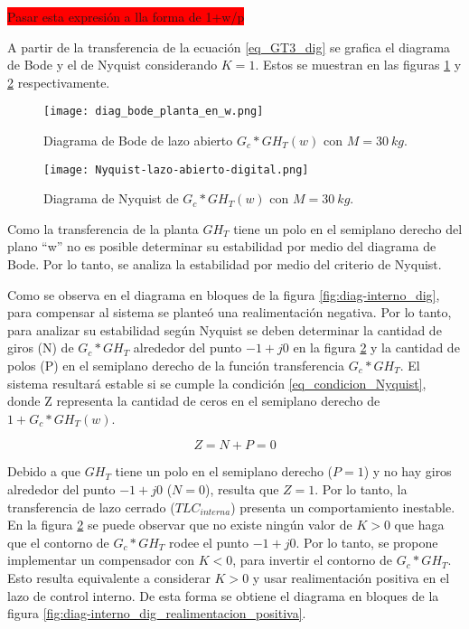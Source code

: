 \colorbox{red}{Pasar esta expresión a lla forma de 1+w/p}

 A partir de la transferencia de la ecuación  \ref{eq_GT3_dig} se  grafica el diagrama de Bode y el de Nyquist considerando $K=1$. Estos se muestran en las figuras \ref{fig:bode_digital} y \ref{fig:nyquist-lazo-abierto-digital} respectivamente.

\begin{figure}[H]
	\centering
	\texttt{[image: diag\_bode\_planta\_en\_w.png]}
	\caption{Diagrama de Bode de lazo abierto $G_c*GH_{T}(w)$ con $M=30\:kg$.}
	\label{fig:bode_digital}
\end{figure}

\begin{figure}[H]
	\centering
	\texttt{[image: Nyquist-lazo-abierto-digital.png]}
	\caption{Diagrama de Nyquist de $G_c*GH_{T}(w)$ con $M=30\:kg$.}
	\label{fig:nyquist-lazo-abierto-digital}
\end{figure}

Como la transferencia de la planta $GH_T$ tiene un polo en el semiplano derecho del plano ``w'' no es posible determinar su estabilidad por medio del diagrama de Bode. Por lo tanto, se analiza la estabilidad por medio del criterio de Nyquist.

Como se observa en el diagrama en bloques de la figura \ref{fig:diag-interno_dig}, para compensar al sistema se planteó una realimentación negativa. Por lo tanto, para analizar su estabilidad según Nyquist se deben determinar la cantidad de giros (N) de $G_c*GH_T$ alrededor del punto $-1+j0$ en la figura \ref{fig:nyquist-lazo-abierto-digital} y la cantidad de polos (P) en el semiplano derecho de la función transferencia $G_c*GH_T$. El sistema resultará estable si se cumple la condición \ref{eq_condicion_Nyquist}, donde Z representa la cantidad de ceros en el semiplano derecho de $1+G_c*GH_T(w)$.

\begin{equation}\label{eq_condicion_Nyquist}
	Z=N+P=0
\end{equation}


Debido a que $GH_T$ tiene un polo en el semiplano derecho ($P=1$) y no hay giros alrededor del punto $-1+j0$ ($N=0$), resulta que $Z=1$. Por lo tanto, la transferencia de lazo cerrado ($TLC_{interna}$) presenta un comportamiento inestable. En la figura \ref{fig:nyquist-lazo-abierto-digital} se puede observar que no existe ningún valor de $K>0$ que haga que el contorno de $G_c*GH_T$ rodee el punto $-1+j0$. Por lo tanto, se propone implementar un compensador con $K<0$, para invertir el contorno de $G_c*GH_T$. Esto resulta equivalente a considerar $K>0$ y usar realimentación positiva en el lazo de control interno. De esta forma se obtiene el diagrama en bloques de la figura \ref{fig:diag-interno_dig_realimentacion_positiva}.


